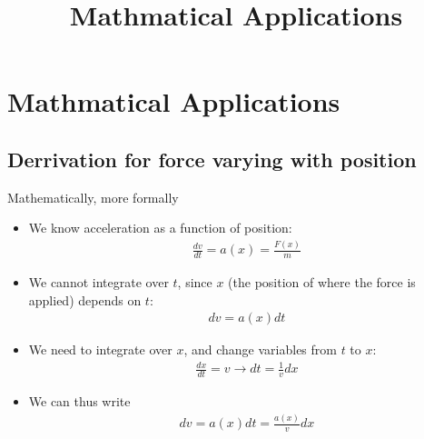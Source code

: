 \documentclass[aspectratio=169,
hyperref={colorlinks,urlcolor=blue}
]{beamer}
\begin{document}

\section{Mathmatical Applications}
\label{sec:mathmaticalapplications}
\title{Mathmatical Applications}
\author{\insertsubsection}


\begin{frame}
\titlepage
\thispagestyle{empty}
\end{frame}








\subsection{Derrivation for force varying with position}
\begin{frame}{Mathematically, more formally}
\begin{itemize}
\item<1-> We know acceleration as a function of position:
\begin{align*}
\frac{dv}{dt}=a(x)=\frac{F(x)}{m}
\end{align*}
\item<2-> We cannot integrate over $t$, since $x$ (the position of where the force is applied) depends on $t$:
\begin{align*}
dv=a(x)dt
\end{align*}
\item<3-> We need to integrate over $x$, and change variables from $t$ to $x$:
\begin{align*}
\frac{dx}{dt}=v\rightarrow dt=\frac{1}{v}dx
\end{align*}
\item<4-> We can thus write
\begin{align*}
dv=a(x)dt=\frac{a(x)}{v}dx
\end{align*}
\end{itemize}
\end{frame}
\end{document}
